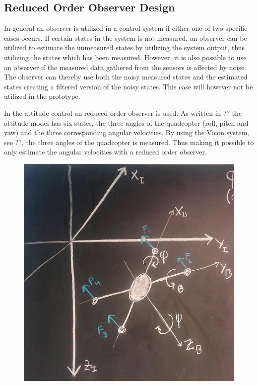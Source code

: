 \subsection{Reduced Order Observer Design}

In general an observer is utilized in a control system if either one of two specific cases occurs. If certain states in the system is not measured, an observer can be utilized to estimate the unmeasured states by utilizing the system output, thus utilizing the states which has been measured. However, it is also possible to use an observer if the measured data gathered from the sensors is affected by noise. The observer can thereby use both the noisy measured states and the estimated states creating a filtered version of the noisy states. This case will however not be utilized in the prototype.

In the attitude control an reduced order observer is used. As written in ?? the attitude model has six states, the three angles of the quadcopter (roll, pitch and yaw) and the three corresponding angular velocities. By using the Vicon system, see ??, the three angles of the quadcopter is measured. Thus making it possible to only estimate the angular velocities with a reduced order observer. 

\begin{figure}[H]
\includegraphics[scale=.27]{figures/drone_diagram}
\centering
\captionsetup{justification=centering}
\label{diagramQuad}
\end{figure}

